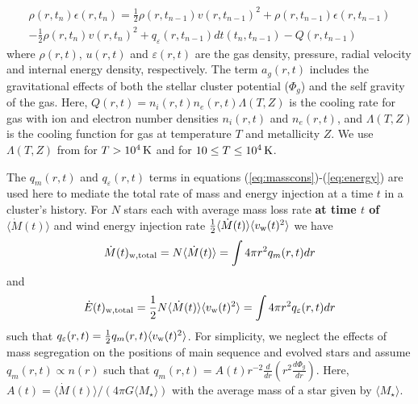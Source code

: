 \documentclass[fleqn,usenatbib]{mnras}
\begin{document}
\begin{equation}
\begin{multlined}
\rho(r,t_n)\epsilon(r,t_n) = \frac{1}{2}\rho(r,t_{n-1})v(r,t_{n-1})^2 + \rho(r,t_{n-1})\epsilon(r,t_{n-1})  \\
- \frac{1}{2}\rho(r,t_{n})v(r,t_{n})^2 + q_\varepsilon(r,t_{n-1})dt(t_n,t_{n-1})-Q(r,t_{n-1})
\label{eq:energyLong}
\end{multlined}
\end{equation}
 where $ \rho(r,t)$, $u(r,t)$ and $\varepsilon(r,t)$ are the gas density, pressure,  radial velocity and internal energy density, respectively.    
The term $a_g(r,t)$ includes the gravitational effects of both the stellar cluster potential ($\Phi_g$) and the self gravity of the gas.
 Here,  $Q(r,t) = n_i(r,t) n_e(r,t) \Lambda(T,Z)$ is the cooling rate for gas with ion and electron number densities 
$n_i(r,t)$ and $n_e(r,t)$, and $\Lambda(T,Z)$ is the cooling function for gas at temperature $T$ and 
metallicity $Z$.  We use $\Lambda(T,Z)$ from \cite{gnat2007} for $T > 10^4 \, {\rm K}$ and 
\cite{dalgarno1972} for $10 \le T \le 10^4 \, {\rm K}$.
 
 The $q_m(r,t)$ and $q_\varepsilon(r,t)$ terms in equations (\ref{eq:masscons})-(\ref{eq:energy}) are used here to mediate  the total rate of mass and energy injection at a time $t$ in a cluster's history.
For $N$ stars each with average mass loss rate {\bf at time $t$ of} $\langle \dot{M}(t)\rangle$ and wind energy injection rate $\frac{1}{2} \langle \dot{M}(t)\rangle \langle v_{\rm w}(t)^2\rangle$ 
we have 
\begin{equation}
\dot{M}(t)_{\rm w,total} =  N \langle \dot{M}(t)\rangle = \int 4 \pi r^2 q_m(r,t) dr 
\label{eq:mdotgen}
\end{equation}
 and 
\begin{equation}
\dot{E}(t)_{\rm w, total} = \frac{1}{2} N \langle \dot{M}(t) \rangle \langle v_{\rm w}(t)^2\rangle = \int 4 \pi r^2 q_\varepsilon(r,t) dr
\label{eq:kegen}
\end{equation} 
such that $q_\varepsilon(r,t) = \frac{1}{2} q_m(r,t) \langle v_{\rm w}(t)^2 \rangle$.   
 For simplicity, we neglect the effects of mass segregation on the positions of main sequence and evolved stars and assume 
$q_m(r,t) \propto n(r)$ such that $q_m(r,t) = A(t) r^{-2} \frac{d}{dr} \left(r^2 \frac{d\Phi_g}{dr}\right)$.  Here, $A(t) = \langle \dot{M}(t) \rangle / (4 \pi G \langle M_\star \rangle)$ with the average mass of a star given by $\langle M_\star \rangle$.
\end{document}
